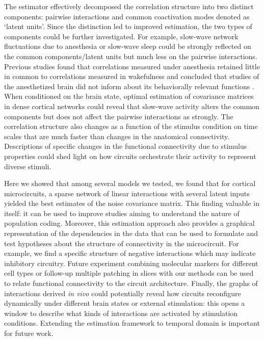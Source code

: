 \documentclass[10pt]{article}
\newcommand{\sq}[1]{\lq#1\rq}
\begin{document}
The estimator effectively decomposed the correlation structure into two distinct components: pairwise interactions and common coactivation modes denoted as \sq{latent units}.  Since the distinction led to improved estimation, the two types of components could be further investigated.  For example, slow-wave network fluctuations due to anesthesia or slow-wave sleep could be strongly reflected on the common components/latent units but much less on the pairwise interactions. Previous studies found that correlations measured under anesthesia retained little in common to correlations measured in wakefulness and concluded that studies of the anesthetized brain did not inform about its behaviorally relevant functions \cite{Greenberg:2008}.  When conditioned on the brain state, optimal estimation of covariance matrices in dense cortical networks could reveal that slow-wave activity alters the common components but does not affect the pairwise interactions as strongly.  The correlation structure also changes as a function of the stimulus condition \cite{Cotton:2013} on time scales that are much faster than changes in the anatomical connectivity. Descriptions of specific changes in the functional connectivity due to stimulus properties could shed light on how circuits orchestrate their activity to represent diverse stimuli.

Here we showed that among several models we tested, we found that for cortical microcircuits, a sparse network of linear interactions with several latent inputs yielded the best estimates of the noise covariance matrix.  This finding valuable in itself: it can be used to improve studies aiming to understand the nature of population coding. Moreover, this estimation approach also provides a graphical representation of the dependencies in the data that can be used to formulate and test hypotheses about the structure of connectivity in the microcircuit.  For example, we find a specific structure of negative interactions which may indicate inhibitory circuitry. Future experiment combining molecular markers for different cell types or follow-up multiple patching in slices \cite{Ko:2012}  with our methods can be used to relate functional connectivity to the circuit architecture. Finally, the graphs of interactions derived \emph{in vivo} could potentially reveal how circuits reconfigure dynamically under different brain states or external stimulation: this opens a window to describe what kinds of interactions are activated by stimulation conditions. Extending the estimation framework to temporal domain is important for future work.
\end{document}
